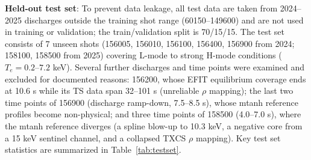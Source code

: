\documentclass[a4paper,12pt]{article}
\begin{document}
\textbf{Held-out test set}: To prevent data leakage, all test data are taken from 2024--2025 discharges outside the training shot range (60150--149600) and are not used in training or validation; the train/validation split is 70/15/15. The test set consists of 7 unseen shots (156005, 156010, 156100, 156400, 156900 from 2024; 158100, 158500 from 2025) covering L-mode to strong H-mode conditions ($T_e = 0.2$--$7.2$ keV). Several further discharges and time points were examined and excluded for documented reasons: 156200, whose EFIT equilibrium coverage ends at 10.6 s while its TS data span 32--101 s (unreliable $\rho$ mapping); the last two time points of 156900 (discharge ramp-down, 7.5--8.5 s), whose mtanh reference profiles become non-physical; and three time points of 158500 (4.0--7.0 s), where the mtanh reference diverges (a spline blow-up to 10.3 keV, a negative core from a 15 keV sentinel channel, and a collapsed TXCS $\rho$ mapping). Key test set statistics are summarized in Table~\ref{tab:testset}.
\end{document}
